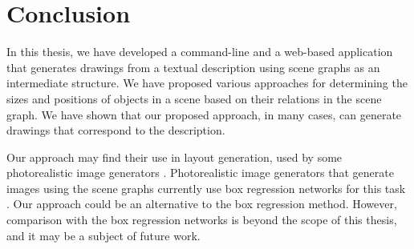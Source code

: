 \chapter*{Conclusion}

In this thesis, we have developed a command-line and a web-based application that generates drawings from a textual description using scene graphs as an intermediate structure. We have proposed various approaches for determining the sizes and positions of objects in a scene based on their relations in the scene graph. We have shown that our proposed approach, in many cases, can generate drawings that correspond to the description. 

\medskip

Our approach may find their use in layout generation, used by some photorealistic image generators  \citep{zhao2019image}.  Photorealistic image generators that generate images using the scene graphs currently use box regression networks for this task \citep{johnson2018image,tripathi2019using}. Our approach could be an alternative to the box regression method. However, comparison with the box regression networks is beyond the scope of this thesis, and it may be a subject of future work.
